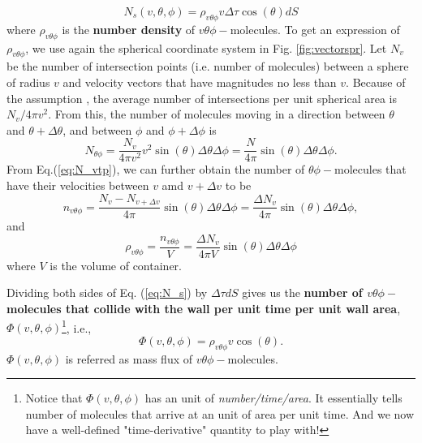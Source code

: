 \begin{equation}
	N_s(v,\theta,\phi) = \rho_{v\theta\phi} v\Delta\tau\cos(\theta)dS
	\label{eq:N_s}
\end{equation}
where $ \rho_{v\theta\phi} $ is the \textbf{number density} of $ v\theta\phi-$molecules. To get an expression of $ \rho_{v\theta\phi} $, we use again the spherical coordinate system in Fig. \ref{fig:vectorspr}. Let $ N_v $ be the number of intersection points (i.e. number of molecules) between a sphere of radius $ v $ and velocity vectors that have magnitudes no less than $ v $. Because of the assumption , the average number of intersections per unit spherical area is $ N_v/4\pi v^2 $. From this, the number of molecules moving in a direction between $ \theta $ and $ \theta+\Delta\theta $, and between $ \phi $ and $ \phi+\Delta\phi $ is 
\begin{equation}
	N_{\theta\phi} = \frac{N_v}{4\pi v^2}v^2\sin(\theta)\Delta\theta\Delta\phi=\frac{N}{4\pi}\sin(\theta)\Delta\theta\Delta\phi.
	\label{eq:N_vtp}
\end{equation}
From Eq.(\ref{eq:N_vtp}), we can further obtain the number of $ \theta\phi-$molecules that have their velocities between $ v $ amd $ v+\Delta v $ to be
\begin{equation}
	n_{v\theta\phi}=\frac{N_v-N_{v+\Delta  v}}{4\pi}\sin(\theta)\Delta\theta\Delta\phi=\frac{\Delta N_v}{4\pi}\sin(\theta)\Delta\theta\Delta\phi,
\end{equation}
and
\begin{equation}
	\rho_{v\theta\phi} = \frac{n_{v\theta\phi}}{V}=\frac{\Delta N_v}{4\pi V}\sin(\theta)\Delta\theta\Delta\phi
	\label{eq:rho_vtp}
\end{equation}
where $ V $ is the volume of container.

Dividing both sides of Eq. (\ref{eq:N_s}) by $ \Delta\tau dS $ gives us the \textbf{ number of $ v\theta\phi- $molecules that collide with the wall per unit time per unit wall area}, $ \Phi(v,\theta, \phi) $\footnote{Notice that $ \Phi(v,\theta, \phi) $ has an unit of \textit{number/time/area}. It essentially tells number of molecules that arrive at an unit of area per unit time. And we now have a well-defined "time-derivative" quantity to play with!}, i.e.,
\begin{equation}
	\Phi(v,\theta, \phi) = \rho_{v\theta\phi} v\cos(\theta).
	\label{eq:mass-flux}
\end{equation}
$ \Phi(v,\theta, \phi) $ is referred as mass flux of $ v\theta\phi- $molecules.

